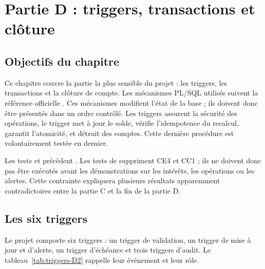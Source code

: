 \chapter{Partie D : triggers, transactions et clôture}
\label{chap:partieD2}

\section{Objectifs du chapitre}

Ce chapitre couvre la partie la plus sensible du projet : les triggers, les
transactions et la clôture de compte. Les mécanismes PL/SQL utilisés suivent
la référence officielle \cite{oraclePLSQL}. Ces mécanismes modifient l'état de la
base ; ils doivent donc être présentés dans un ordre contrôlé. Les triggers
assurent la sécurité des opérations, le trigger  met à jour le
solde,  vérifie l'idempotence du recalcul, 
garantit l'atomicité, et  détruit des comptes. Cette dernière
procédure est volontairement testée en dernier.

\begin{attentionbox}[Chronologie]
Les tests  et  précèdent . Les
tests de  suppriment CE4 et CC1 ; ils ne doivent donc pas
être exécutés avant les démonstrations sur les intérêts, les opérations ou les
alertes. Cette contrainte expliquera plusieurs résultats apparemment
contradictoires entre la partie C et la fin de la partie D.
\end{attentionbox}

\section{Les six triggers}

Le projet comporte six triggers : un trigger  de validation, un
trigger  de mise à jour et d'alerte, un trigger d'échéance
et trois triggers d'audit. Le tableau~\ref{tab:triggers-D2} rappelle leur
événement et leur rôle.


